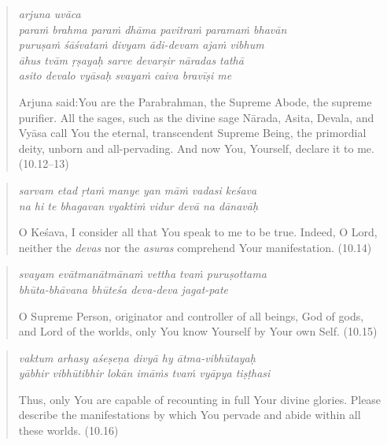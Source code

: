 \documentclass[12pt, twoside, openright]{memoir}
\begin{document}
\par
\begin{verse}
\textit{arjuna uvāca} \\
\textit{paraṁ brahma paraṁ dhāma pavitraṁ paramaṁ bhavān} \\
\textit{puruṣaṁ śāśvataṁ divyam ādi-devam ajaṁ vibhum} \\
\textit{āhus tvām ṛṣayaḥ sarve devarṣir nāradas tathā} \\
\textit{asito devalo vyāsaḥ svayaṁ caiva bravīṣi me}

\noindent \quad Arjuna said:\linebreak You are the Parabrahman, the Supreme Abode, the supreme purifier. All the sages, such as the divine sage Nārada, Asita, Devala, and Vyāsa call You the eternal, transcendent Supreme Being, the primordial deity, unborn and all-pervading. And now You, Yourself, declare it to me. (10.12–13)
\end{verse}
\par



\par
\begin{verse}
\textit{sarvam etad ṛtaṁ manye yan māṁ vadasi keśava} \\
\textit{na hi te bhagavan vyaktiṁ vidur devā na dānavāḥ}

\noindent O Keśava, I consider all that You speak to me to be true. Indeed, O Lord, neither the \textit{devas} nor the \textit{asuras} comprehend Your manifestation. (10.14)
\end{verse}
\par



\par
\begin{verse}
\textit{svayam evātmanātmānaṁ vettha tvaṁ puruṣottama} \\
\textit{bhūta-bhāvana bhūteśa deva-deva jagat-pate}

\noindent O Supreme Person, originator and controller of all beings, God of gods, and Lord of the worlds, only You know Yourself by Your own Self. (10.15)
\end{verse}
\par



\par
\begin{verse}
\textit{vaktum arhasy aśeṣeṇa divyā hy ātma-vibhūtayaḥ} \\
\textit{yābhir vibhūtibhir lokān imāṁs tvaṁ vyāpya tiṣṭhasi}

\noindent Thus, only You are capable of recounting in full Your divine glories. Please describe the manifestations by which You pervade and abide within all these worlds. (10.16)
\end{verse}
\par
\end{document}
